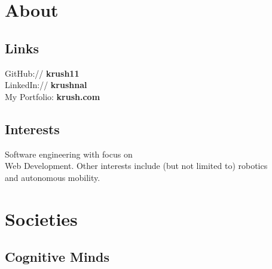 \documentclass[letterpaper]{deedy-resume} %
\begin{document}
\begin{minipage}[t]{0.33\textwidth}
\sectionspace %

\section{About} 

\subsection{Links}
GitHub:// {\bf krush11} \\
LinkedIn:// {\bf krushnal} \\
My Portfolio: \textbf{krush.com} \\

\sectionspace

\subsection{Interests}
Software engineering with focus on \\
Web Development. Other interests include 
(but not limited to) robotics\\
and autonomous mobility.

\sectionspace %

\section{Societies}
\subsection{Cognitive Minds}

\sectionspace %

\end{minipage} %
\hfill
%
%
\end{document}
